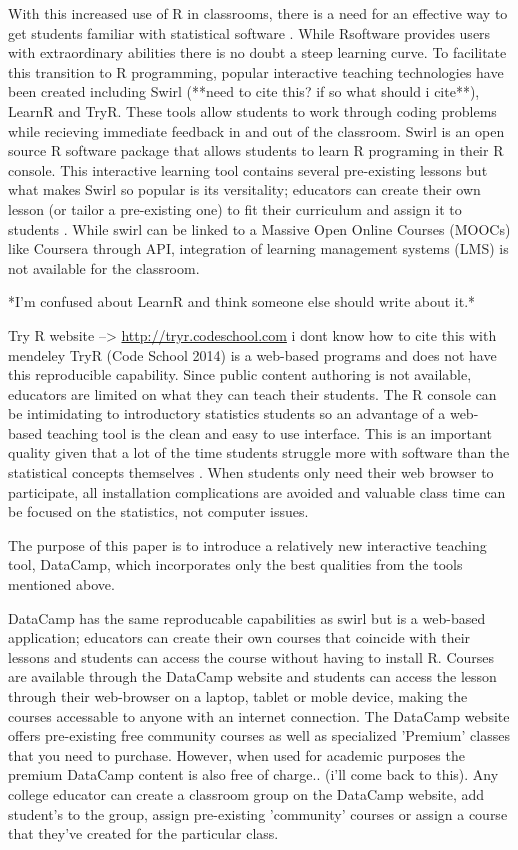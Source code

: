 \documentclass[12pt]{article}
\begin{document}
With this increased use of R in classrooms, there is a need for an effective way to get students familiar with statistical software
\cite{Baumer2014}. While Rsoftware provides users with extraordinary abilities there is no doubt a steep learning curve. To facilitate
this transition to R programming, popular interactive teaching technologies have been created including Swirl (**need to cite this?
if so what should i cite**), LearnR and TryR. 
These tools allow students to work through coding problems while recieving immediate feedback in and out of the classroom. Swirl is an
open source R software package that allows students to learn R programing in their R console. This interactive learning tool
contains several pre-existing lessons but what makes Swirl so popular is its versitality; educators can create their own
lesson (or tailor a pre-existing one) to fit their curriculum and assign it to students \cite{Carchedi2014}.
While swirl can be linked to a Massive Open Online Courses (MOOCs) like Coursera through API, integration of learning management 
systems (LMS) is not available for the classroom.

*I'm confused about LearnR and think someone else should write about it.*


Try R website --> \url{http://tryr.codeschool.com} i dont know how to cite this with mendeley
TryR (Code School 2014) is a web-based programs and does not have this reproducible capability. Since public content authoring
is not available, educators are limited on what they can teach their students. The R console can be intimidating to
introductory statistics students so an advantage of a web-based teaching tool is
the clean and easy to use interface. This is an important quality given that a lot of the time students struggle more with
software than the statistical concepts themselves \cite{Hare2017}. When students only need their web browser to participate,
all installation complications are avoided and valuable class time can be focused on the statistics, not computer issues.

The purpose of this paper is to introduce a relatively new interactive teaching tool, DataCamp, which incorporates only the best
qualities from the tools mentioned above.

DataCamp has the same reproducable capabilities as swirl but is a web-based application; educators can
create their own courses that coincide with their lessons and students can access the course without having to install R.
Courses are available through the DataCamp website and students can access the lesson through their web-browser on a laptop,
tablet or moble device, making the courses accessable to anyone with an internet connection. 
The DataCamp website offers pre-existing free community courses as well as specialized 'Premium' classes that you need to purchase. 
However, when used for academic purposes the premium DataCamp content is also free of charge.. (i'll come back to this).
Any college educator can create a classroom group on the DataCamp website, add student's to the group, assign pre-existing 
'community' courses or assign a course that they've created for the particular class. 
\end{document}
